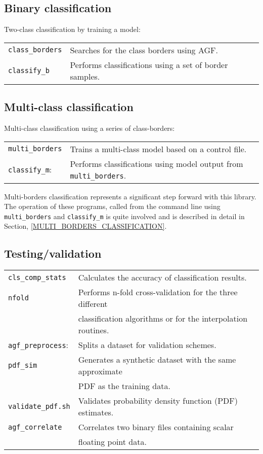 \documentclass[12pt]{article}
\begin{document}
\subsection{Binary classification}

Two-class classification by training a model:

\begin{tabular}{ll}
\verb/class_borders/ & Searches for the class borders using AGF.\\
\verb/classify_b/ & Performs classifications using a set of border samples.
\end{tabular}

\subsection{Multi-class classification}

Multi-class classification using a series of class-borders:

\begin{tabular}{ll}
\verb/multi_borders/ & 	Trains a multi-class model based on a control file.\\
\verb/classify_m/: & Performs classifications using model output from \verb/multi_borders/.
\end{tabular}

  Multi-borders classification represents a significant step forward with this library.  The operation of these programs, called from the command line using \verb/multi_borders/ and \verb/classify_m/ is quite involved and is described in detail in Section, \ref{MULTI_BORDERS_CLASSIFICATION}.

\subsection{Testing/validation}

\begin{tabular}{ll}
\verb/cls_comp_stats/ &	Calculates the accuracy of classification results.\\
\verb/nfold/ &	Performs n-fold cross-validation for the three different \\
		    & classification algorithms or for the interpolation routines.\\
\verb/agf_preprocess/: & Splits a dataset for validation schemes.\\
\verb/pdf_sim/ & Generates a synthetic dataset with the same approximate \\
		      & PDF as the training data.\\
\verb/validate_pdf.sh/ & Validates probability density function (PDF) estimates.\\
\verb/agf_correlate/ & Correlates two binary files containing scalar \\
			    & floating point data.
\end{tabular}
\end{document}
